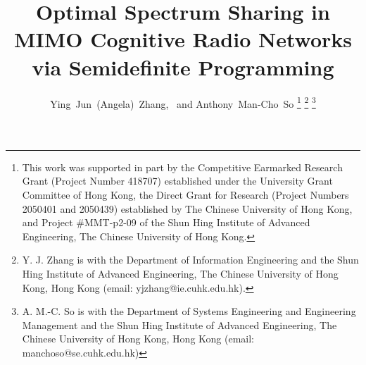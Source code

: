 \documentclass[twocolumn,10pt]{IEEEtran}
\theoremstyle{plain} \newtheorem{theorem}{Theorem}
\theoremstyle{plain} \newtheorem{proposition}{Proposition}
\theoremstyle{plain} \newtheorem{corollary}{Corollary}
\theoremstyle{remark} \newtheorem{remark}{Remark}
\theoremstyle{remark} \newtheorem{lemma}{Lemma}
\theoremstyle{plain} \newtheorem{definition}{Definition}
\theoremstyle{plain} \newtheorem{assumption}{Assumption}
\theoremstyle{plain} \newtheorem{fact}{Fact}
\begin{document}
\title{Optimal Spectrum Sharing in MIMO Cognitive Radio Networks via Semidefinite Programming}
\author{Ying~Jun~(Angela)~Zhang,~ and Anthony~Man-Cho~So
\thanks{This work was supported in part by the Competitive Earmarked
Research Grant (Project Number 418707) established under the
University Grant Committee of Hong Kong, the Direct Grant for Research (Project Numbers 2050401 and 2050439) established by The Chinese University of Hong Kong, and Project \#MMT-p2-09 of the Shun Hing Institute of Advanced Engineering, The Chinese University of Hong Kong.}
\thanks{Y. J. Zhang is with the Department of Information Engineering and the Shun Hing Institute of Advanced Engineering, The Chinese University of Hong Kong, Hong Kong (email: yjzhang@ie.cuhk.edu.hk).}
\thanks{A. M.-C. So is with the Department of Systems Engineering and Engineering Management and the Shun Hing Institute of Advanced Engineering, The Chinese University of Hong Kong, Hong Kong (email: manchoso@se.cuhk.edu.hk)}
}

\maketitle
\end{document}
